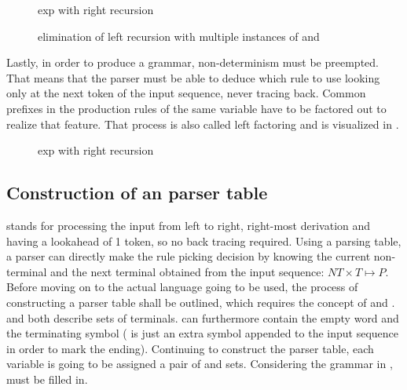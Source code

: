\begin{figure}
	\centering
	
	

	\caption{exp with right recursion}
	\label{fig:grammar_expRR}
\end{figure}

\begin{figure}
	\centering
	
	

	\caption{elimination of left recursion with multiple instances of \textalpha{} and \textbeta{}}
	\label{fig:grammar_elimLRMultiple}
\end{figure}

\FloatBarrier

Lastly, in order to produce a \textlang{} grammar, non-determinism must be preempted. That means that the parser must be able to deduce which rule to use looking only at the next token of the input sequence, never tracing back. Common prefixes in the production rules of the same variable have to be factored out to realize that feature. That process is also called left factoring and is visualized in .

\begin{figure}[H]
	\centering

	
	
	\caption{exp with right recursion}
	\label{fig:grammar_expLeftFactoring}
\end{figure}

\FloatBarrier
\subsection{Construction of an \textlang{} parser table}

\textlang{} stands for processing the input from left to right, right-most derivation and having a lookahead of 1 token, so no back tracing required. Using a parsing table, a \textlang{} parser can directly make the rule picking decision by knowing the current non-terminal and the next terminal obtained from the input sequence: $NT \times T \mapsto P$. Before moving on to the actual language going to be used, the process of constructing a \textlang{} parser table shall be outlined, which requires the concept of  and .  and  both describe sets of terminals.  can furthermore contain the empty word \textemptyword{} and  the terminating symbol \textterminator{} (\textterminator{} is just an extra symbol appended to the input sequence in order to mark the ending). Continuing to construct the parser table, each variable is going to be assigned a pair of  and  sets. Considering the grammar in ,  must be filled in.

